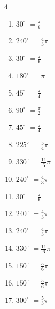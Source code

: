 \begin{multicols}{4}
\begin{enumerate}
  \item $\displaystyle 30^{\circ}$
        $\displaystyle =\frac{\pi}{6}$

  \item $\displaystyle 240^{\circ}$
        $\displaystyle =\frac{4}{3}\pi$

  \item $\displaystyle 30^{\circ}$
        $\displaystyle =\frac{\pi}{6}$

  \item $\displaystyle 180^{\circ}$
        $\displaystyle =\pi$

  \item $\displaystyle 45^{\circ}$
        $\displaystyle =\frac{\pi}{4}$

  \item $\displaystyle 90^{\circ}$
        $\displaystyle =\frac{\pi}{2}$

  \item $\displaystyle 45^{\circ}$
        $\displaystyle =\frac{\pi}{4}$

  \item $\displaystyle 225^{\circ}$
        $\displaystyle =\frac{5}{4}\pi$

  \item $\displaystyle 330^{\circ}$
        $\displaystyle =\frac{11}{6}\pi$

  \item $\displaystyle 240^{\circ}$
        $\displaystyle =\frac{4}{3}\pi$

  \item $\displaystyle 30^{\circ}$
        $\displaystyle =\frac{\pi}{6}$

  \item $\displaystyle 240^{\circ}$
        $\displaystyle =\frac{4}{3}\pi$

  \item $\displaystyle 240^{\circ}$
        $\displaystyle =\frac{4}{3}\pi$

  \item $\displaystyle 330^{\circ}$
        $\displaystyle =\frac{11}{6}\pi$

  \item $\displaystyle 150^{\circ}$
        $\displaystyle =\frac{5}{6}\pi$

\columnbreak %

  \item $\displaystyle 150^{\circ}$
        $\displaystyle =\frac{5}{6}\pi$

  \item $\displaystyle 300^{\circ}$
        $\displaystyle =\frac{5}{3}\pi$


\end{enumerate}
\end{multicols}
